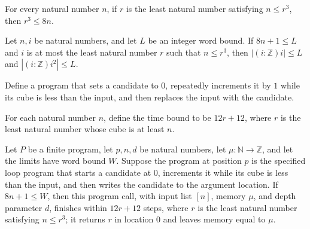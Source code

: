 \begin{theorem}
\label{Light.cbrtLeast_pow_le}
\leanok
{}
For every natural number $n$, if $r$ is the least natural number satisfying $n\le r^3$,
then $r^3\le 8n$.
\end{theorem}

\begin{theorem}
\label{Light.abs_cube_le}
\leanok
{}
Let $n,i$ be natural numbers, and let $L$ be an integer word bound. If $8n+1\le L$ and
$i$ is at most the least natural number $r$ such that $n\le r^3$, then $|(i: \mathbb
Z)i|\le L$ and $|(i: \mathbb Z)i^2|\le L$.
\end{theorem}

\begin{definition}
\label{Light.cbrtCeilBody}
\leanok
{}
Define a program that sets a candidate to $0$, repeatedly increments it by $1$ while its
cube is less than the input, and then replaces the input with the candidate.
\end{definition}

\begin{definition}
\label{Light.cbrtCeilTime}
\leanok
{}
For each natural number $n$, define the time bound to be $12r+12$, where $r$ is the
least natural number whose cube is at least $n$.
\end{definition}

\begin{theorem}
\label{Light.cbrtCeil_meets}
\leanok
{}
Let $P$ be a finite program, let $p,n,d$ be natural numbers, let $\mu:\mathbb
N\to\mathbb Z$, and let the limits have word bound $W$. Suppose the program at position
$p$ is the specified loop program that starts a candidate at $0$, increments it while
its cube is less than the input, and then writes the candidate to the argument location.
If $8n+1\le W$, then this program call, with input list $[n]$, memory $\mu$, and depth
parameter $d$, finishes within $12r+12$ steps, where $r$ is the least natural number
satisfying $n\le r^3$; it returns $r$ in location $0$ and leaves memory equal to $\mu$.
\end{theorem}

